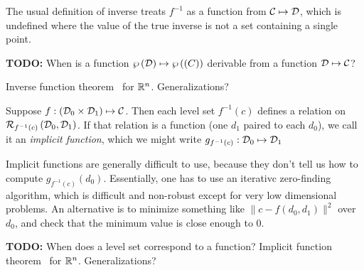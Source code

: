 The usual definition of inverse treats $f^{-1}$
as a function from $\mathcal{C} \mapsto \mathcal{D}$,
which is undefined where the value of the true
inverse is not a set containing a single point.

\textbf{TODO:} When is a function 
$ \wp \left( \mathcal{D} \right)   \mapsto  \wp \left( \mathcal{(}C) \right) $
derivable from a function $\mathcal{D} \mapsto \mathcal{C}$?

Inverse function theorem~\cite[][Theorem 2-1]{spivak-1965}
for $\mathbb{R}^n$. 
Generalizations?~\cite{wiki:Inverse-function-theorem}

\label{sec:Implicit-functions}

Suppose 
$f : \left( \mathcal{D}_0 \times \mathcal{D}_1 \right) \mapsto \mathcal{C}$.
Then each level set $f^{-1}\left( c \right)$ defines a relation on 
$\mathcal{R}_{f^{-1}(c)} \left( \mathcal{D}_0 , \mathcal{D}_1 \right)$.
If that relation is a function
(one $d_1$ paired to each $d_0$),
we call it an \textit{implicit function},
which we might write $g_{f^{-1}(c)} : \mathcal{D}_0 \mapsto \mathcal{D}_1$

Implicit functions are generally difficult to use,
because they don't tell us how to compute 
$g_{f^{-1}(c)} \left( d_0 \right)$.
Essentially, one has to use an iterativc zero-finding 
algorithm, which is difficult and non-robust except
for very low dimensional problems.
An alternative is to minimize something like
$\| c - f\left( d_0, d_1 \right) \|^2$ over $d_0$,
and check that the minimum value is close enough to $0$.

\textbf{TODO:} When does a level set correspond to a function?
Implicit function theorem~\cite[][Theorem 2-2]{spivak-1965}
for $\mathbb{R}^n$. 
Generalizations?~\cite{wiki:Implicit-function-theorem,
wiki:Inverse-function-theorem}






